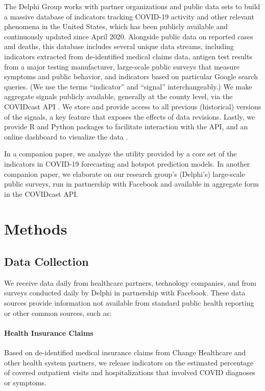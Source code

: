 \documentclass[9pt,twocolumn,twoside,lineno]{pnas-new}
\begin{document}
The Delphi Group works with partner organizations and public data sets to build
a massive database of indicators tracking COVID-19 activity and other relevant
phenomena in the United States, which has been publicly available and
continuously updated since April 2020. Alongside public data on reported cases
and deaths, this database includes several unique data streams, including
indicators extracted from de-identified medical claims data, antigen test
results from a major testing manufacturer, large-scale public surveys that
measure symptoms and public behavior, and indicators based on particular Google
search queries. (We use the terms ``indicator'' and ``signal'' interchangeably.)
We make aggregate signals publicly available, generally at the county level, via
the COVIDcast API \cite{CovidcastAPI}. We store and provide access to all
previous (historical) versions of the signals, a key feature that exposes the
effects of data revisions.  Lastly, we provide R \cite{CovidcastR} and Python
\cite{CovidcastPy} packages to facilitate interaction with the API, and an
online dashboard to visualize the data \cite{CovidcastViz}.

In a companion paper, we analyze the utility provided by a core set of the
indicators in COVID-19 forecasting and hotspot prediction models.  In another
companion paper, we elaborate on our research group's (Delphi's) large-scale
public surveys, run in partnership with Facebook and available in aggregate form
in the COVIDcast API.

\section{Methods}

\subsection{Data Collection}

We receive data daily from healthcare partners, technology companies, and from
surveys conducted daily by Delphi in partnership with Facebook. These data
sources provide information not available from standard public health reporting
or other common sources, such as:

\paragraph{Health Insurance Claims} Based on de-identified medical insurance
claims from Change Healthcare and other health system partners, we release
indicators on the estimated percentage of covered outpatient visits and
hospitalizations that involved COVID diagnoses or symptoms.
\end{document}
